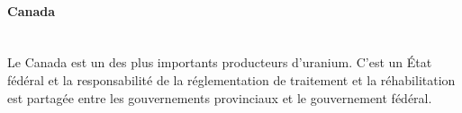 \documentclass{article}
\begin{document}





\paragraph{Canada \\ \\}

Le Canada est un des plus importants producteurs d'uranium. C'est un État fédéral et la responsabilité de la réglementation de traitement et la réhabilitation est partagée entre les gouvernements provinciaux et le gouvernement fédéral.
\end{document}
